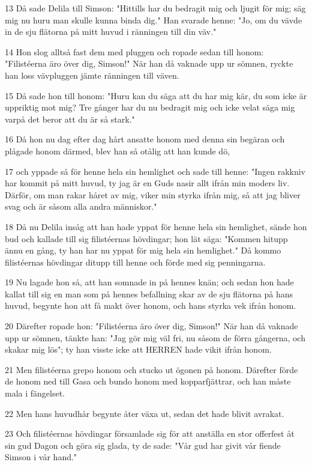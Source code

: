\par 13 Då sade Delila till Simson: "Hittills har du bedragit mig och ljugit för mig; säg mig nu huru man skulle kunna binda dig." Han svarade henne: "Jo, om du vävde in de sju flätorna på mitt huvud i ränningen till din väv."
\par 14 Hon slog alltså fast dem med pluggen och ropade sedan till honom: "Filistéerna äro över dig, Simson!" När han då vaknade upp ur sömnen, ryckte han loss vävpluggen jämte ränningen till väven.
\par 15 Då sade hon till honom: "Huru kan du säga att du har mig kär, du som icke är uppriktig mot mig? Tre gånger har du nu bedragit mig och icke velat säga mig varpå det beror att du är så stark."
\par 16 Då hon nu dag efter dag hårt ansatte honom med denna sin begäran och plågade honom därmed, blev han så otålig att han kunde dö,
\par 17 och yppade så för henne hela sin hemlighet och sade till henne: "Ingen rakkniv har kommit på mitt huvud, ty jag är en Guds nasir allt ifrån min moders liv. Därför, om man rakar håret av mig, viker min styrka ifrån mig, så att jag bliver svag och är såsom alla andra människor."
\par 18 Då nu Delila insåg att han hade yppat för henne hela sin hemlighet, sände hon bud och kallade till sig filistéernas hövdingar; hon lät säga: "Kommen hitupp ännu en gång, ty han har nu yppat för mig hela sin hemlighet." Då kommo filistéernas hövdingar ditupp till henne och förde med sig penningarna.
\par 19 Nu lagade hon så, att han somnade in på hennes knän; och sedan hon hade kallat till sig en man som på hennes befallning skar av de sju flätorna på hans huvud, begynte hon att få makt över honom, och hans styrka vek ifrån honom.
\par 20 Därefter ropade hon: "Filistéerna äro över dig, Simson!" När han då vaknade upp ur sömnen, tänkte han: "Jag gör mig väl fri, nu såsom de förra gångerna, och skakar mig lös"; ty han visste icke att HERREN hade vikit ifrån honom.
\par 21 Men filistéerna grepo honom och stucko ut ögonen på honom. Därefter förde de honom ned till Gasa och bundo honom med kopparfjättrar, och han måste mala i fängelset.
\par 22 Men hans huvudhår begynte åter växa ut, sedan det hade blivit avrakat.
\par 23 Och filistéernas hövdingar församlade sig för att anställa en stor offerfest åt sin gud Dagon och göra sig glada, ty de sade: "Vår gud har givit vår fiende Simson i vår hand."
